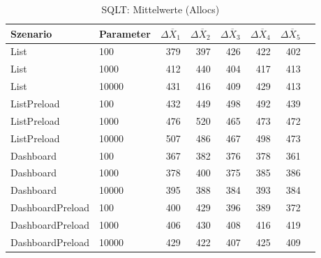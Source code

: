 
\begin{table}[ht]
\setlength{\extrarowheight}{-1pt}
\centering
\caption{SQLT: Mittelwerte (Allocs)}
\begin{tabular}{llrrrrrr}
\toprule
Szenario & Parameter & ${\Delta \overline{X}_1}$ & ${\Delta \overline{X}_2}$ & ${\Delta \overline{X}_3}$ & ${\Delta \overline{X}_4}$ & ${\Delta \overline{X}_5}$ \\
\midrule
	List & 100 & 379 & 397 & 426 & 422 & 402 \\
	List & 1000 & 412 & 440 & 404 & 417 & 413 \\
	List & 10000 & 431 & 416 & 409 & 429 & 413 \\
	ListPreload & 100 & 432 & 449 & 498 & 492 & 439 \\
	ListPreload & 1000 & 476 & 520 & 465 & 473 & 472 \\
	ListPreload & 10000 & 507 & 486 & 467 & 498 & 473 \\
	Dashboard & 100 & 367 & 382 & 376 & 378 & 361 \\
	Dashboard & 1000 & 378 & 400 & 375 & 385 & 386 \\
	Dashboard & 10000 & 395 & 388 & 384 & 393 & 384 \\
	DashboardPreload & 100 & 400 & 429 & 396 & 389 & 372 \\
	DashboardPreload & 1000 & 406 & 430 & 408 & 416 & 419 \\
	DashboardPreload & 10000 & 429 & 422 & 407 & 425 & 409 \\
\bottomrule
\end{tabular}
\label{tab:mittelwerte_sqlt_allocs}
\end{table}
	